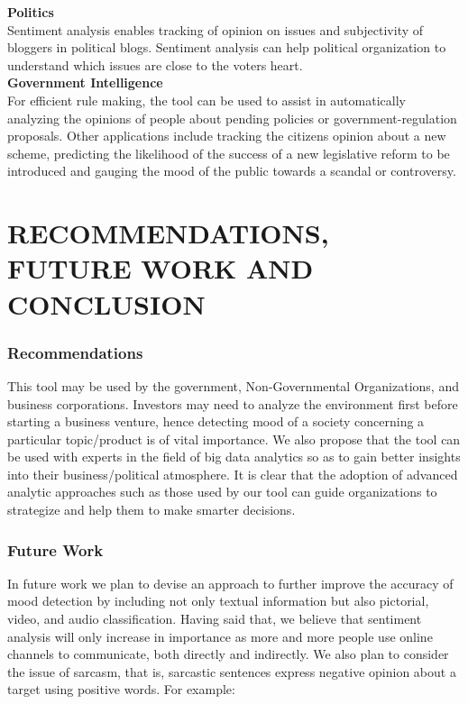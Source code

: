 \textbf{Politics}\\
Sentiment analysis enables tracking of opinion on issues and subjectivity of bloggers in
political blogs. Sentiment analysis can help political organization to understand which issues
are close to the voter\textquotesingle s heart.\\

\textbf{Government Intelligence}\\
For efficient rule making, the tool can be used to assist in automatically analyzing the opinions of
people about pending policies or government-regulation proposals. Other applications include
tracking the citizen\textquotesingle s opinion about a new scheme, predicting the likelihood of the success of a new legislative reform to be introduced and gauging the mood of the public towards a scandal
or controversy.



\chapter{RECOMMENDATIONS, FUTURE WORK AND CONCLUSION}
\subsection{Recommendations}
This tool may be used by the government, Non-Governmental Organizations, and business
corporations. Investors may need to analyze the environment first before starting a business
venture, hence detecting mood of a society concerning a particular topic/product is of vital importance.
We also propose that the tool can be used with experts in the field of big data analytics so as to gain
better insights into their business/political atmosphere. It is clear that the adoption of advanced analytic approaches such as those used by our tool can guide organizations to  strategize and help them to make smarter decisions.\\

\subsection{Future Work}
In future work we plan to devise an approach to further improve the accuracy of mood detection by including not only textual information but also pictorial, video, and audio classification.
Having said that, we believe that sentiment analysis will only increase in importance as more and
more people use online channels to communicate, both directly and indirectly.
We also plan to consider the issue of sarcasm, that is, sarcastic sentences express negative opinion
about a target using positive words. For example:\\

